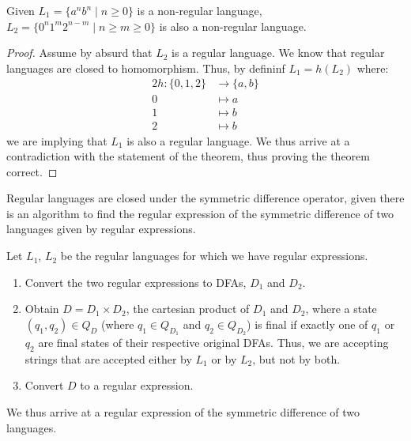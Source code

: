 \documentclass[docid=2018/19]{tcom_exam}
\begin{document}
{\begin{minipage}[c]{0.4\textwidth}
\begin{center}
	\end{center}
\end{minipage}
\begin{theorem}
	Given $L_1=\{a^n b^n \mid n \geq 0\}$ is a non-regular language, $L_2=\{0^n 1^m 2^{n-m} \mid  n \geq m \geq 0\}$ is also a non-regular language.
\end{theorem}
\begin{proof}
	Assume by absurd that $L_2$ is a regular language. We know that regular languages are closed to homomorphism. Thus, by defininf $L_1=h(L_2)$ where:
	\begin{alignat*}{2}
		h \colon \{0,1,2\} &\rightarrow \{a,b\}\\
		0                  &\mapsto a\\
		1                  &\mapsto b\\
		2                  &\mapsto b
	\end{alignat*}
	we are implying that $L_1$ is also a regular language. We thus arrive at a contradiction with the statement of the theorem, thus proving the theorem correct.
\end{proof}
Regular languages are closed under the symmetric difference operator, given there is an algorithm to find the regular expression of the symmetric difference of two languages given by regular expressions.\par
Let $L_1$, $L_2$ be the regular languages for which we have regular expressions.
\begin{enumerate}
	\item Convert the two regular expressions to DFAs, $D_1$ and $D_2$.
	\item Obtain $D=D_1 \times D_2$, the cartesian product of $D_1$ and $D_2$, where a state $(q_1,q_2)\in Q_D$ (where $q_1 \in Q_{D_1}$ and $q_2 \in Q_{D_2}$) is final if exactly one of $q_1$ or $q_2$ are final states of their respective original DFAs. Thus, we are accepting strings that are accepted either by $L_1$ or by $L_2$, but not by both.
	\item Convert $D$ to a regular expression.
\end{enumerate}
We thus arrive at a regular expression of the symmetric difference of two languages.
}
\end{document}
